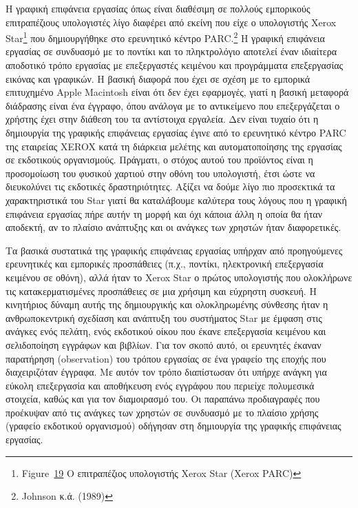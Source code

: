 \documentclass[
]{article}
\begin{document}
Η γραφική επιφάνεια εργασίας όπως είναι διαθέσιμη σε πολλούς εμπορικούς
επιτραπέζιους υπολογιστές λίγο διαφέρει από εκείνη που είχε ο
υπολογιστής Xerox Star\footnote{Figure~\protect\hyperlink{fig:xerox-star-pc}{19}
  Ο επιτραπέζιος υπολογιστής Xerox Star (Xerox PARC)} που δημιουργήθηκε
στο ερευνητικό κέντρο PARC.\footnote{Johnson κ.ά. (1989)} Η γραφική
επιφάνεια εργασίας σε συνδυασμό με το ποντίκι και το πληκτρολόγιο
αποτελεί έναν ιδιαίτερα αποδοτικό τρόπο εργασίας με επεξεργαστές
κειμένου και προγράμματα επεξεργασίας εικόνας και γραφικών. Η βασική
διαφορά που έχει σε σχέση με το εμπορικά επιτυχημένο Apple Macintosh
είναι ότι δεν έχει εφαρμογές, γιατί η βασική μεταφορά διάδρασης είναι
ένα έγγραφο, όπου ανάλογα με το αντικείμενο που επεξεργάζεται ο χρήστης
έχει στην διάθεση του τα αντίστοιχα εργαλεία. Δεν είναι τυχαίο ότι η
δημιουργία της γραφικής επιφάνειας εργασίας έγινε από το ερευνητικό
κέντρο PARC της εταιρείας XEROX κατά τη διάρκεια μελέτης και
αυτοματοποίησης της εργασίας σε εκδοτικούς οργανισμούς. Πράγματι, ο
στόχος αυτού του προϊόντος είναι η προσομοίωση του φυσικού χαρτιού στην
οθόνη του υπολογιστή, έτσι ώστε να διευκολύνει τις εκδοτικές
δραστηριότητες. Αξίζει να δούμε λίγο πιο προσεκτικά τα χαρακτηριστικά
του Star γιατί θα καταλάβουμε καλύτερα τους λόγους που η γραφική
επιφάνεια εργασίας πήρε αυτήν τη μορφή και όχι κάποια άλλη η οποία θα
ήταν αποδεκτή, αν το πλαίσιο ανάπτυξης και οι ανάγκες των χρηστών ήταν
διαφορετικές.

Τα βασικά συστατικά της γραφικής επιφάνειας εργασίας υπήρχαν από
προηγούμενες ερευνητικές και εμπορικές προσπάθειες (π.χ., ποντίκι,
ηλεκτρονική επεξεργασία κειμένου σε οθόνη), αλλά ήταν το Xerox Star ο
πρώτος υπολογιστής που ολοκλήρωνε τις κατακερματισμένες προσπάθειες σε
μια χρήσιμη και εύχρηστη συσκευή. Η κινητήριος δύναμη αυτής της
δημιουργικής και ολοκληρωμένης σύνθεσης ήταν η ανθρωποκεντρική σχεδίαση
και ανάπτυξη του συστήματος Star με έμφαση στις ανάγκες ενός πελάτη,
ενός εκδοτικού οίκου που έκανε επεξεργασία κειμένου και σελιδοποίηση
εγγράφων και βιβλίων. Για τον σκοπό αυτό, οι ερευνητές έκαναν παρατήρηση
(observation) του τρόπου εργασίας σε ένα γραφείο της εποχής που
διαχειριζόταν έγγραφα. Με αυτόν τον τρόπο διαπίστωσαν ότι υπήρχε ανάγκη
για εύκολη επεξεργασία και αποθήκευση ενός εγγράφου που περιείχε
πολυμεσικά στοιχεία, καθώς και για τον διαμοιρασμό του. Οι παραπάνω
προδιαγραφές που προέκυψαν από τις ανάγκες των χρηστών σε συνδυασμό με
το πλαίσιο χρήσης (γραφείο εκδοτικού οργανισμού) οδήγησαν στη δημιουργία
της γραφικής επιφάνειας εργασίας.
\end{document}
